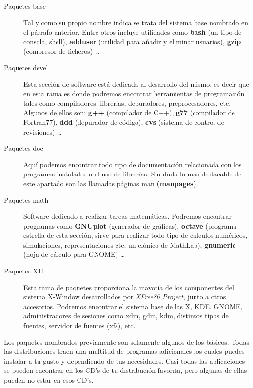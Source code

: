 \begin{description}

\item[Paquetes base] Tal  y como su propio nombre indica  se trata del
sistema  base nombrado  en el  párrafo anterior.  Entre otros  incluye
utilidades como {\bf bash} (un  tipo de consola, shell), {\bf adduser}
(utilidad para añadir  y eliminar usuarios), {\bf  gzip} (compresor de
ficheros) \ldots

\item[Paquetes  devel]  Esta  sección  de software  está  dedicada  al
desarrollo del  mismo, es  decir que  en esta  rama es  donde podremos
encontrar  herramientas  de   programación  tales  como  compiladores,
librerías, depuradores,  preprocesadores, etc.  Algunos de  ellos son:
{\bf g++}  (compilador de C++),  {\bf g77} (compilador  de Fortran77),
{\bf  ddd} (depurador  de código),  {\bf cvs}  (sistema de  control de
revisiones) \ldots

\item[Paquetes doc] Aquí podemos  encontrar todo tipo de documentación
relacionada con  los programas instalados  o el uso de  librerías. Sin
duda lo más  destacable de este apartado son las  llamadas páginas man
{\bf (manpages)}.

\item[Paquetes math] Software dedicado  a realizar tareas matemáticas.
Podremos  encontrar   programas  como  {\bf  GNUplot}   (generador  de
gráficas),  {\bf octave}  (programa  estrella de  esta sección,  sirve
para  realizar   todo  tipo   de  cálculos   numéricos,  simulaciones,
representaciones etc; un clónico de  MathLab), {\bf gnumeric} (hoja de
cálculo para GNOME) \ldots

\item[Paquetes X11]  Esta rama de  paquetes proporciona la  mayoría de
los componentes  del sistema  X-Window desarrollados por  {\em XFree86
Project}, junto a otros accesorios. Podremos encontrar el sistema base
de las X, KDE, GNOME, administradores  de sesiones como xdm, gdm, kdm,
distintos tipos de fuentes, servidor de fuentes (xfs), etc.

\end{description}

Los  paquetes  nombrados  previamente  son solamente  algunos  de  los
básicos.  Todas las  distribuciones  traen una  multitud de  programas
adicionales los cuales puedes instalar a tu gusto y dependiendo de tus
necesidades. Casi  todas las aplicaciones  se pueden encontrar  en los
CD's  de tu  distribución favorita,  pero algunas  de ellas  pueden no
estar en esos CD's.

